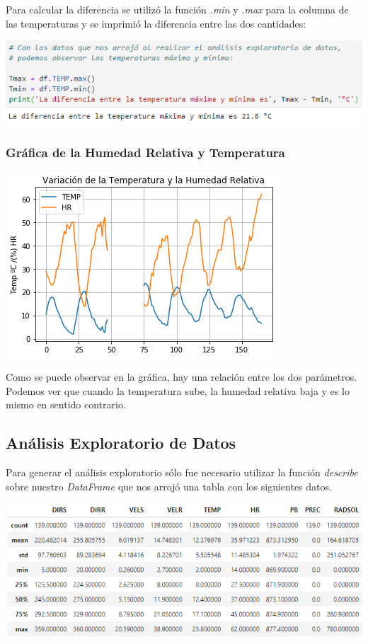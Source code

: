 \documentclass{article}
\begin{document}
Para calcular la diferencia se utilizó la función \textit{.min} y \textit{.max} para la columna de las temperaturas y se imprimió la diferencia entre las dos cantidades:
\begin{center}
    \includegraphics{Temp.png}
\end{center}

\subsubsection{Gráfica de la Humedad Relativa y Temperatura}
\begin{center}
    \includegraphics[scale = 1]{GTemp.png}
\end{center}
Como se puede observar en la gráfica, hay una relación entre los dos parámetros. Podemos ver que cuando la temperatura sube, la humedad relativa baja y es lo mismo en sentido contrario.

\subsection{Análisis Exploratorio de Datos}
Para generar el análisis exploratorio sólo fue necesario utilizar la función \textit{describe} sobre nuestro \textit{DataFrame} que nos arrojó una tabla con los siguientes datos.

\begin{center}
    \includegraphics[width = \textwidth]{Describe.png}
\end{center}
\end{document}
